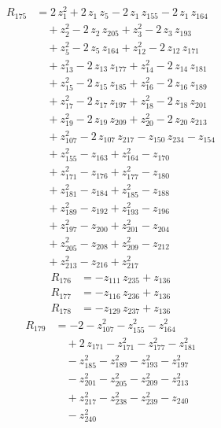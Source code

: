 \begin{equation*}\begin{aligned}
R_{175}&=2\,z_{1}^{2} +2\,z_{1}\,z_{5} -2\,z_{1}\,z_{155} -2\,z_{1}\,z_{164} \\
&\quad +z_{2}^{2} -2\,z_{2}\,z_{205} +z_{3}^{2} -2\,z_{3}\,z_{193} \\
&\quad +z_{5}^{2} -2\,z_{5}\,z_{164} +z_{12}^{2} -2\,z_{12}\,z_{171} \\
&\quad +z_{13}^{2} -2\,z_{13}\,z_{177} +z_{14}^{2} -2\,z_{14}\,z_{181} \\
&\quad +z_{15}^{2} -2\,z_{15}\,z_{185} +z_{16}^{2} -2\,z_{16}\,z_{189} \\
&\quad +z_{17}^{2} -2\,z_{17}\,z_{197} +z_{18}^{2} -2\,z_{18}\,z_{201} \\
&\quad +z_{19}^{2} -2\,z_{19}\,z_{209} +z_{20}^{2} -2\,z_{20}\,z_{213} \\
&\quad +z_{107}^{2} -2\,z_{107}\,z_{217} -z_{150}\,z_{234} -z_{154} \\
&\quad +z_{155}^{2} -z_{163} +z_{164}^{2} -z_{170} \\
&\quad +z_{171}^{2} -z_{176} +z_{177}^{2} -z_{180} \\
&\quad +z_{181}^{2} -z_{184} +z_{185}^{2} -z_{188} \\
&\quad +z_{189}^{2} -z_{192} +z_{193}^{2} -z_{196} \\
&\quad +z_{197}^{2} -z_{200} +z_{201}^{2} -z_{204} \\
&\quad +z_{205}^{2} -z_{208} +z_{209}^{2} -z_{212} \\
&\quad +z_{213}^{2} -z_{216} +z_{217}^{2}
\end{aligned}\end{equation*}
\begin{equation*}\begin{aligned}
R_{176}&=-z_{111}\,z_{235} +z_{136}
\end{aligned}\end{equation*}
\begin{equation*}\begin{aligned}
R_{177}&=-z_{116}\,z_{236} +z_{136}
\end{aligned}\end{equation*}
\begin{equation*}\begin{aligned}
R_{178}&=-z_{129}\,z_{237} +z_{136}
\end{aligned}\end{equation*}
\begin{equation*}\begin{aligned}
R_{179}&=-2 -z_{107}^{2} -z_{155}^{2} -z_{164}^{2} \\
&\quad +2\,z_{171} -z_{171}^{2} -z_{177}^{2} -z_{181}^{2} \\
&\quad -z_{185}^{2} -z_{189}^{2} -z_{193}^{2} -z_{197}^{2} \\
&\quad -z_{201}^{2} -z_{205}^{2} -z_{209}^{2} -z_{213}^{2} \\
&\quad +z_{217}^{2} -z_{238}^{2} -z_{239}^{2} -z_{240} \\
&\quad -z_{240}^{2}
\end{aligned}\end{equation*}
